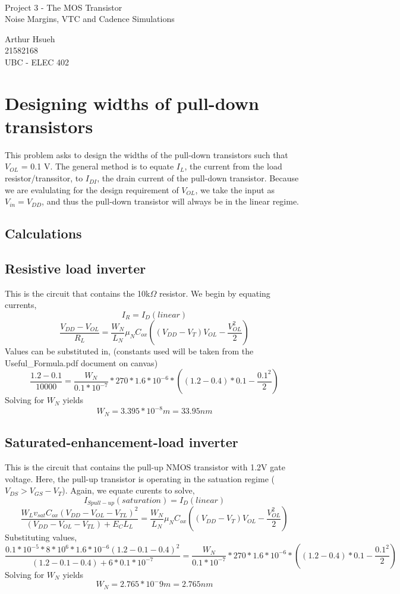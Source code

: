 \documentclass[12pt]{article}
\newcommand{\doctitle}{Project 3 - The MOS Transistor}
\newcommand{\docsubtitle}{Noise Margins, VTC and Cadence Simulations}
\renewcommand{\maketitle} {
    \setlength{\parindent}{0pt}
    \begin{center} \
        \vspace*{1in}

        \huge{\doctitle}\\
        \Large{\docsubtitle}

        \vspace*{0.2in}
        \large{
            Arthur Hsueh\\
            21582168\\
            UBC - ELEC 402
        }
    \end{center}
}
\begin{document}
\maketitle
\thispagestyle{empty}
\pagebreak

\tableofcontents
\thispagestyle{empty}
\pagebreak

\listoffigures
\thispagestyle{empty}

\listoftables
\thispagestyle{empty}

\pagebreak
\setcounter{page}{1}

\section{Designing widths of pull-down transistors}
This problem asks to design the widths of the pull-down transistors such that $V_{OL}$ = 0.1 V. The general
method is to equate $I_{L}$, the current from the load resistor/transsitor, to $I_{DI}$, the drain current of the 
pull-down transistor. Because we are evalulating for the design requirement of $V_{OL}$, we take the input as
$V_{in} = V_{DD}$, and thus the pull-down transistor will always be in the linear regime.
\subsection{Calculations}

\subsection*{Resistive load inverter}
This is the circuit that contains the 10k$\Omega$ resistor. We begin by equating currents,
\[ I_R = I_{D}(linear) \]
\[\frac{V_{DD} - V_{OL}}{R_L} = \frac{W_N}{L_N} \mu_N C_{ox} ((V_{DD} - V_T) V_{OL} - \frac{V_{OL}^2}{2}) \]
Values can be substituted in, (constants used will be taken from the Useful\_Formula.pdf document on canvas)
\[\frac{1.2 - 0.1}{10000} = \frac{W_N}{0.1*10^{-7}}*270*1.6*10^{-6} *((1.2 - 0.4)*0.1 - \frac{0.1^2}{2}) \]
Solving for $W_N$ yields
\[ W_N = 3.395 * 10^{-8}m = 33.95 nm\]

\subsection*{Saturated-enhancement-load inverter}
This is the circuit that contains the pull-up NMOS transistor with 1.2V gate voltage. Here, the pull-up
transistor is operating in the satuation regime ($V_{DS} > V_{GS} - V_T$). Again, we equate curents to solve,
\[ I_{S pull-up}(saturation) = I_{D}(linear)\]
\[\frac{W_L v_{sat}C_{ox}(V_{DD} - V_{OL} - V_{TL})^2}{(V_{DD} - V_{OL} - V_{TL}) + E_C L_L} = \frac{W_N}{L_N} \mu_N C_{ox} ((V_{DD} - V_T)V_{OL} - \frac{V_{OL}^2}{2}) \]
Substituting values,
\[\frac{0.1*10^{-5}* 8*10^6 *1.6 * 10^{-6}(1.2 - 0.1 - 0.4)^2}{(1.2 - 0.1 - 0.4) + 6*0.1*10^{-7}} = \frac{W_N}{0.1*10^{-7}}*270*1.6*10^{-6} *((1.2 - 0.4)*0.1 - \frac{0.1^2}{2})\]
Solving for $W_N$ yields
\[ W_N = 2.765*10^-9m = 2.765nm\]
\end{document}
